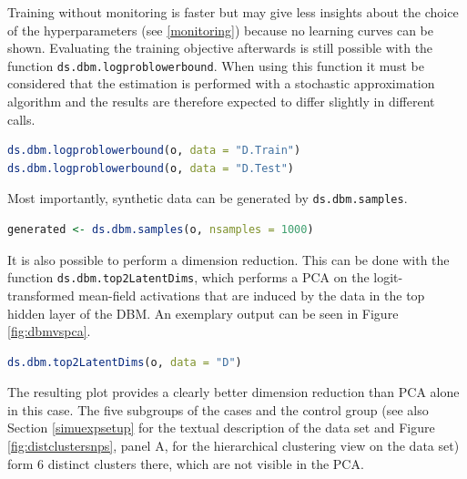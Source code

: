 \documentclass[12pt]{article}
\newcommand{\inlinecode}[1]{\texttt{#1}}
\begin{document}
Training without monitoring is faster but may give less insights about the choice of the hyperparameters (see \ref{monitoring}) because no learning curves can be shown.
Evaluating the training objective afterwards is still possible with the function \inlinecode{ds.dbm.logproblowerbound}.
When using this function it must be considered that the estimation is performed with a stochastic approximation algorithm and the results are therefore expected to differ slightly in different calls.

\begin{lstlisting}[language=R]
ds.dbm.logproblowerbound(o, data = "D.Train")
ds.dbm.logproblowerbound(o, data = "D.Test")
\end{lstlisting}



Most importantly, synthetic data can be generated by \inlinecode{ds.dbm.samples}. 

\begin{lstlisting}[language=R, float=!h]
generated <- ds.dbm.samples(o, nsamples = 1000)
\end{lstlisting}

It is also possible to perform a dimension reduction.
This can be done with the function \inlinecode{ds.dbm.top2LatentDims}, which performs a PCA on the logit-transformed mean-field activations that are induced by the data in the top hidden layer of the DBM.
An exemplary output can be seen in Figure \ref{fig:dbmvspca}.
\begin{lstlisting}[language=R]
ds.dbm.top2LatentDims(o, data = "D")
\end{lstlisting}

The resulting plot provides a clearly better dimension reduction than PCA alone in this case.
The five subgroups of the cases and the control group (see also Section \ref{simuexpsetup} for the textual description of the data set and Figure \ref{fig:distclustersnps}, panel A, for the hierarchical clustering view on the data set) form 6 distinct clusters there, which are not visible in the PCA.
\end{document}
